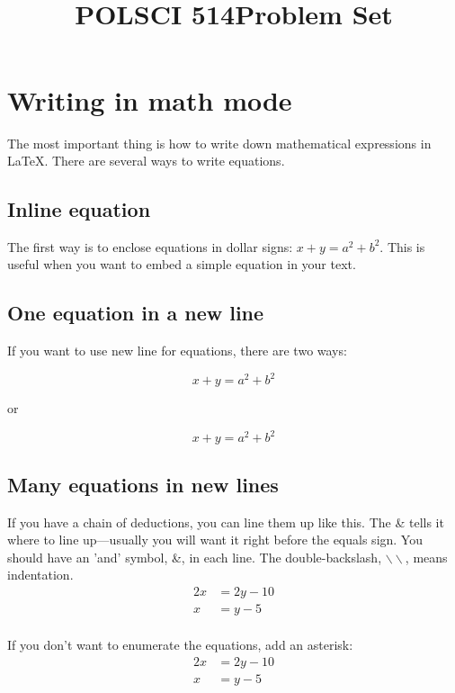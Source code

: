 \documentclass[11pt]{article}
\title{\vspace{-50pt}
\Huge \name
\\\vspace{20pt}
\huge POLSCI 514\hfill Problem Set \hw}
\author{}
\date{}
\theoremstyle{quest}
\begin{document}
\maketitle



\section{Writing in math mode}
The most important thing is how to write down mathematical expressions in \LaTeX.
There are several ways to write equations. 

\subsection{Inline equation}
The first way is to enclose equations in dollar signs: $x+y=a^2+b^2$.
This is useful when you want to embed a simple equation in your text.

\subsection{One equation in a new line}
If you want to use new line for equations, there are two ways:

\[x+y=a^2+b^2\]

or

$$
x+y=a^2+b^2
$$

\subsection{Many equations in new lines}
If you have a chain of deductions, you can line them up like this.
The \& tells it where to line up---usually you will want it right before the equals sign.
You should have an 'and' symbol, \&, in each line.
The double-backslash, $\backslash\backslash$, means indentation. 
\begin{equation}
\begin{split}
  2x &= 2y-10 \\
  x &=y -5   \\
\end{split}
\end{equation}


If you don't want to enumerate the equations, add an asterisk:
\begin{equation}
\begin{split}
  2x &= 2y-10 \\
  x &=y -5  
\end{split}
\end{equation}
\end{document}
